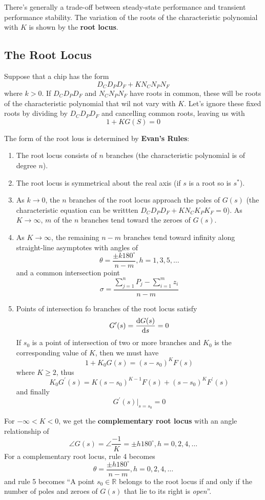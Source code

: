 \documentclass[12pt]{article}
\begin{document}
There's generally a trade-off between steady-state performance and transient performance stability. The variation of the roots of the characteristic polynomial with $K$ is shown by the {\bf root locus}.

\subsection{The Root Locus}
Suppose that a chip has the form \[ D_CD_PD_F + KN_CN_PN_F \] where $k > 0$. If $D_CD_PD_F$ and $N_CN_PN_F$ have roots in common, these will be roots of the characteristic polynomial that wil not vary with $K$. Let's ignore these fixed roots by dividing by $D_CD_PD_F$ and cancelling common roots, leaving us with \[ 1 + KG(S) = 0 \]

The form of the root lous is determined by {\bf Evan's Rules}:
\begin{enumerate}
\item The root locus consists of $n$ branches (the characteristic polynomial is of degree $n$).
\item The root locus is symmetrical about the real axis (if $s$ is a root so is $s^*$).
\item As $k\to 0$, the $n$ branches of the root locus approach the poles of $G(s)$ (the characteristic equation can be writtten $D_CD_PD_F + KN_CK_PK_F = 0$). As $K\to\infty$, $m$ of the $n$ branches tend toward the zeroes of $G(s)$.
\item As $K\to\infty$, the remaining $n-m$ branches tend toward infinity along straight-line asymptotes with angles of \[ \theta = \frac{\pm k180^\circ}{n-m}, h=1,3,5,\dots \] and a common intersection point \[ \sigma = \frac{\displaystyle\sum_{j=1}^n P_j - \displaystyle\sum_{i=1}^m z_i}{n-m} \]
\item Points of intersection fo branches of the root locus satisfy \[ G^\prime(s) = \frac{{\rm d} G(s)}{{\rm d} s} = 0 \] If $s_0$ is a point of intersection of two or more branches and $K_0$ is the corresponding value of $K$, then we must have \[ 1 + K_0 G(s) = (s-s_0)^K F(s) \] where $K \geq 2$, thus \[ K_0 G^\prime(s) = K(s-s_0)^{K-1} F(s) + (s-s_0)^K F^\prime(s) \] and finally \[ G^\prime(s) \Bigg|_{s=s_0} = 0 \]
\end{enumerate}

For $-\infty < K < 0$, we get the {\bf complementary root locus} with an angle relationship of \[ \angle G(s) = \angle\frac{-1}{K} = \pm h180^\circ, h=0,2,4,\dots \] For a complementary root locus, rule 4 becomes \[ \theta = \frac{\pm h180^\circ}{n-m}, h=0,2,4,\dots \] and rule 5 becomes ``A point $s_0 \in \mathbb{R}$ belongs to the root locus if and only if the number of poles and zeroes of $G(s)$ that lie to its right is \textit{open}''.
\end{document}
